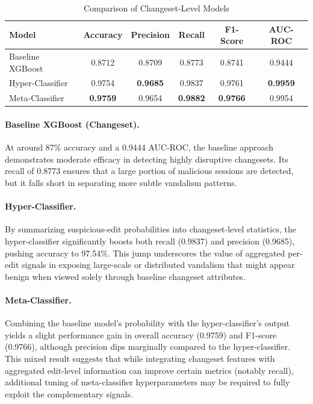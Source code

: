 \documentclass[
    13pt, %
    a4paper, %
    listof=totoc, %
    bibliography=totoc, %
    index=totoc, %
    headsepline
]{scrreprt}
\begin{document}
\begin{table}[htbp]
    \centering
    \caption{Comparison of Changeset-Level Models}
    \label{tab:changeset_comparison}
    \vspace{1em}
    \begin{tabular}{lccccc}
    \toprule
    \textbf{Model} & \textbf{Accuracy} & \textbf{Precision} & \textbf{Recall} & \textbf{F1-Score} & \textbf{AUC-ROC}\\
    \midrule
    Baseline XGBoost & 0.8712 & 0.8709 & 0.8773 & 0.8741 & 0.9444 \\
    Hyper-Classifier             & 0.9754 & \textbf{0.9685} & 0.9837 & 0.9761 & \textbf{0.9959} \\
    Meta-Classifier              & \textbf{0.9759} & 0.9654 & \textbf{0.9882} & \textbf{0.9766} & 0.9954 \\
    \bottomrule
    \end{tabular}
\end{table}

\paragraph{Baseline XGBoost (Changeset).}
At around 87\% accuracy and a 0.9444 AUC-ROC, the baseline approach demonstrates moderate efficacy in detecting highly disruptive changesets. Its recall of 0.8773 ensures that a large portion of malicious sessions are detected, but it falls short in separating more subtle vandalism patterns.

\paragraph{Hyper-Classifier.}
By summarizing suspicious-edit probabilities into changeset-level statistics, the hyper-classifier significantly boosts both recall (0.9837) and precision (0.9685), pushing accuracy to 97.54\%. This jump underscores the value of aggregated per-edit signals in exposing large-scale or distributed vandalism that might appear benign when viewed solely through baseline changeset attributes.

\paragraph{Meta-Classifier.}
Combining the baseline model’s probability with the hyper-classifier’s output yields a slight performance gain in overall accuracy (0.9759) and F1-score (0.9766), although precision dips marginally compared to the hyper-classifier. This mixed result suggests that while integrating changeset features with aggregated edit-level information can improve certain metrics (notably recall), additional tuning of meta-classifier hyperparameters may be required to fully exploit the complementary signals.
\end{document}
